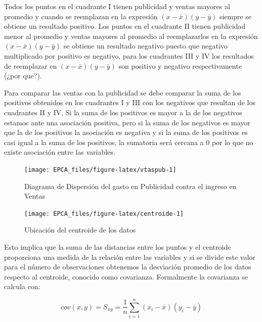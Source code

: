 \documentclass[letterpaper,]{book}
\begin{document}
Todos los puntos en el cuadrante I tienen publicidad y ventas mayores al promedio y cuando se reemplazan en la expresión \(\left(x-\bar{x}\right)\left(y-\bar{y}\right)\) siempre se obtiene un resultado positivo. Los puntos en el cuadrante II tienen publicidad menor al promedio y ventas mayores al promedio al reemplazarlos en la expresión \(\left(x-\bar{x}\right)\left(y-\bar{y}\right)\) se obtiene un resultado negativo puesto que negativo multiplicado por positivo es negativo, para los cuadrantes III y IV los resultados de reemplazar en \(\left(x-\bar{x}\right)\left(y-\bar{y}\right)\) son positivo y negativo respectivamente (¿por que?).

Para comparar las ventas con la publicidad se debe comparar la suma de los positivos obtenidos en los cuadrantes I y III con los negativos que resultan de los cuadrantes II y IV, Si la suma de los positivos es mayor a la de los negativos estamos ante una asociación positiva, pero si la suma de los negativos es mayor que la de los positivos la asociación es negativa y si la suma de los positivos es casi igual a la suma de los positivos, la sumatoria será cercana a \(0\) por lo que no existe asociación entre las variables.

\begin{figure}[!h]

{\centering \texttt{[image: EPCA\_files/figure-latex/vtaspub-1]} 

}

\caption{Diagrama de Dispersión del gasto en Publicidad contra el ingreso en Ventas}\label{fig:vtaspub}
\end{figure}

\begin{figure}[!h]

{\centering \texttt{[image: EPCA\_files/figure-latex/centroide-1]} 

}

\caption{Ubicación del centroide de los datos}\label{fig:centroide}
\end{figure}

Esto implica que la suma de las distancias entre los puntos y el centroide proporciona una medida de la relación entre las variables y si se divide este valor para el número de observaciones obtenemos la desviación promedio de los datos respecto al centroide, conocido como covarianza. Formalmente la covarianza se calcula con:

\begin{equation} 
  cov(x,y) = S_{xy} = \dfrac{1}{n} \sum_{i=1}^{n}\left(x_i-\bar{x}\right)\left(y_i-\bar{y}\right)
  \label{eq:covar}
\end{equation}
\end{document}
